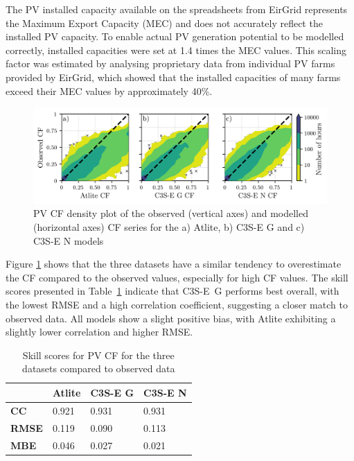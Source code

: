 \documentclass[preprint, 12pt, authoryear]{elsarticle}
\begin{document}
The PV installed capacity available on the spreadsheets from EirGrid represents the Maximum Export Capacity (MEC) and does not accurately reflect the installed PV capacity. To enable actual PV generation potential to be modelled correctly, installed capacities were set at 1.4 times the MEC values. This scaling factor was estimated by analysing proprietary data from individual PV farms provided by EirGrid, which showed that the installed capacities of many farms exceed their MEC values by approximately 40\%.

\begin{figure}[h!]
	\centering
	\includegraphics[width=\textwidth]{verification_pv_contour.png}
	\caption{PV CF density plot of the observed (vertical axes) and modelled (horizontal axes) CF series for the a) Atlite, b) C3S-E G and c) C3S-E N models}	
	\label{fig:solar_verification_contour}
\end{figure}

Figure \ref{fig:solar_verification_contour} shows that the three datasets have a similar tendency to overestimate the CF compared to the observed values, especially for high CF values. The skill scores presented in Table~\ref{tab:pv_skill_scores} indicate that C3S-E~G performs best overall, with the lowest RMSE and a high correlation coefficient, suggesting a closer match to observed data. All models show a slight positive bias, with Atlite exhibiting a slightly lower correlation and higher RMSE.

\begin{table}[!ht]
	\centering
	\begin{tabular}{l|lll|}
		\cline{2-4}
		& \textbf{Atlite} & \textbf{C3S-E G} & \textbf{C3S-E N} \\ \hline
		\multicolumn{1}{|l|}{\textbf{CC}}   & 0.921           & 0.931            & 0.931            \\ \hline
		\multicolumn{1}{|l|}{\textbf{RMSE}} & 0.119           & 0.090            & 0.113            \\ \hline
		\multicolumn{1}{|l|}{\textbf{MBE}}   & 0.046           & 0.027           & 0.021           \\ \hline
	\end{tabular}
	\caption{Skill scores for PV CF for the three datasets compared to observed data}
	\label{tab:pv_skill_scores}
\end{table}
\end{document}
